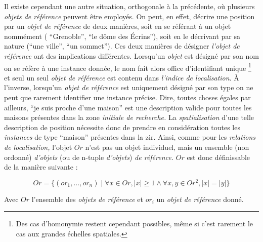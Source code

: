 Il existe cependant une autre situation, orthogonale à la précédente,
où plusieurs \emph{objets de référence} peuvent être employés. On
peut, en effet, décrire une position par un \emph{objet de référence}
de deux manières, soit en se référant à un objet nommément (\eg
\enquote{Grenoble}, \enquote{le dôme des Écrins}), soit en le
décrivant par sa nature (\eg \enquote{une ville}, \enquote{un
  sommet}). Ces deux manières de désigner \emph{l'objet de référence}
ont des implications différentes. Lorsqu'un \emph{objet} est désigné
par son nom on se réfère à une instance donnée, le nom fait alors
office d'identifiant unique \footnote{Des cas d’homonymie restent
  cependant possibles, même si c'est rarement le cas aux grandes
  échelles spatiales.} et seul un seul \emph{objet de référence} est
contenu dans \emph{l'indice de localisation}. À l'inverse, lorsqu'un
\emph{objet de référence} est uniquement désigné par son type on ne
peut que rarement identifier une instance précise. Dire, toutes choses
égales par ailleurs, \enquote{je suis proche d'une maison} est une
description valide pour toutes les maisons présentes dans la zone
\emph{initiale de recherche.} La \emph{spatialisation} d'une telle
description de position nécessite donc de prendre en considération
toutes les \emph{instances} de type \enquote{maison} présentes dans la
\ac{zir}. Ainsi, comme pour les \emph{relations de localisation,}
l'objet \(Or\) n'est pas un objet individuel, mais un ensemble (non
ordonné) \emph{d'objets} (ou de n-tuple \emph{d'objets}) \emph{de
  référence.} \(Or\) est donc définissable de la manière suivante :

\begin{equation}
  Or = \{(or_1, \ldots,  or_n) \mid \forall x \in Or, |x| ≥ 1 \wedge
  \forall x,y \in Or^2, |x| = |y|\}
\end{equation}

Avec \(Or\) l'ensemble des \emph{objets de référence} et \(or_i\) un
\emph{objet de référence} donné.


